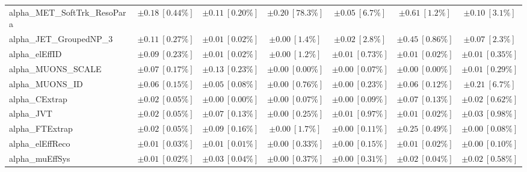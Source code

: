 \begin{sidewaystable}
\begin{center}
\begin{tabular*}{\textwidth}{@{\extracolsep{\fill}}lcccccc}
alpha\_MET\_SoftTrk\_ResoPara         & $\pm 0.18\ [0.44\%] $          & $\pm 0.11\ [0.20\%] $          & $\pm 0.20\ [78.3\%] $          & $\pm 0.05\ [6.7\%] $          & $\pm 0.61\ [1.2\%] $          & $\pm 0.10\ [3.1\%] $       \\
alpha\_JET\_GroupedNP\_3         & $\pm 0.11\ [0.27\%] $          & $\pm 0.01\ [0.02\%] $          & $\pm 0.00\ [1.4\%] $          & $\pm 0.02\ [2.8\%] $          & $\pm 0.45\ [0.86\%] $          & $\pm 0.07\ [2.3\%] $       \\
alpha\_elEffID         & $\pm 0.09\ [0.23\%] $          & $\pm 0.01\ [0.02\%] $          & $\pm 0.00\ [1.2\%] $          & $\pm 0.01\ [0.73\%] $          & $\pm 0.01\ [0.02\%] $          & $\pm 0.01\ [0.35\%] $       \\
alpha\_MUONS\_SCALE         & $\pm 0.07\ [0.17\%] $          & $\pm 0.13\ [0.23\%] $          & $\pm 0.00\ [0.00\%] $          & $\pm 0.00\ [0.07\%] $          & $\pm 0.00\ [0.00\%] $          & $\pm 0.01\ [0.29\%] $       \\
alpha\_MUONS\_ID         & $\pm 0.06\ [0.15\%] $          & $\pm 0.05\ [0.08\%] $          & $\pm 0.00\ [0.76\%] $          & $\pm 0.00\ [0.23\%] $          & $\pm 0.06\ [0.12\%] $          & $\pm 0.21\ [6.7\%] $       \\
alpha\_CExtrap         & $\pm 0.02\ [0.05\%] $          & $\pm 0.00\ [0.00\%] $          & $\pm 0.00\ [0.07\%] $          & $\pm 0.00\ [0.09\%] $          & $\pm 0.07\ [0.13\%] $          & $\pm 0.02\ [0.62\%] $       \\
alpha\_JVT         & $\pm 0.02\ [0.05\%] $          & $\pm 0.07\ [0.13\%] $          & $\pm 0.00\ [0.25\%] $          & $\pm 0.01\ [0.97\%] $          & $\pm 0.01\ [0.02\%] $          & $\pm 0.03\ [0.98\%] $       \\
alpha\_FTExtrap         & $\pm 0.02\ [0.05\%] $          & $\pm 0.09\ [0.16\%] $          & $\pm 0.00\ [1.7\%] $          & $\pm 0.00\ [0.11\%] $          & $\pm 0.25\ [0.49\%] $          & $\pm 0.00\ [0.08\%] $       \\
alpha\_elEffReco         & $\pm 0.01\ [0.03\%] $          & $\pm 0.01\ [0.01\%] $          & $\pm 0.00\ [0.33\%] $          & $\pm 0.00\ [0.15\%] $          & $\pm 0.01\ [0.02\%] $          & $\pm 0.00\ [0.10\%] $       \\
alpha\_muEffSys         & $\pm 0.01\ [0.02\%] $          & $\pm 0.03\ [0.04\%] $          & $\pm 0.00\ [0.37\%] $          & $\pm 0.00\ [0.31\%] $          & $\pm 0.02\ [0.04\%] $          & $\pm 0.02\ [0.58\%] $       \\

\end{tabular*}
\end{center}
\end{sidewaystable}
